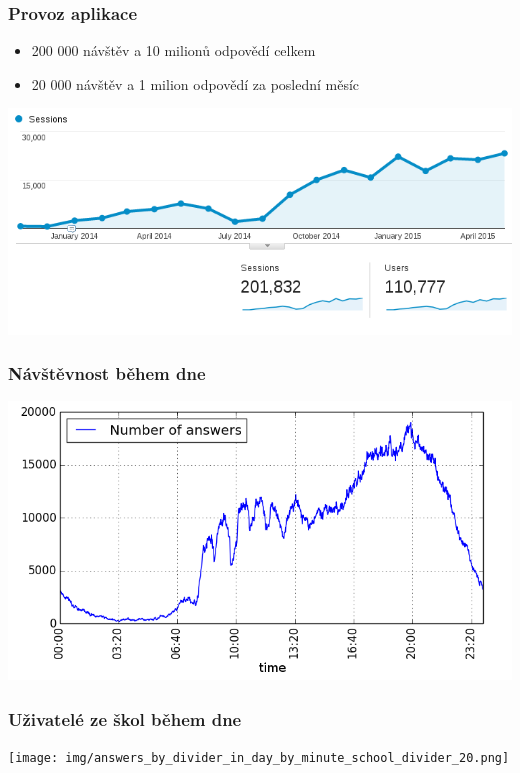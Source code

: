 \documentclass[xcolor=svgnames]{beamer}
\begin{document}
\begin{frame}
	\frametitle{Provoz aplikace}
  \begin{itemize}
    \item 200 000 návštěv a 10 milionů odpovědí celkem
    \item 20 000 návštěv a 1 milion odpovědí za poslední měsíc
  \end{itemize}
   \includegraphics[width=\textwidth]{img/audience.png}
\end{frame}
\begin{frame}
	\frametitle{Návštěvnost během dne}
   \includegraphics[width=\textwidth]{img/answers_in_day_by_minute_absolute.png}
\end{frame}
\begin{frame}
	\frametitle{Uživatelé ze škol během dne}
   \texttt{[image: img/answers\_by\_divider\_in\_day\_by\_minute\_school\_divider\_20.png]}
\end{frame}
\end{document}
